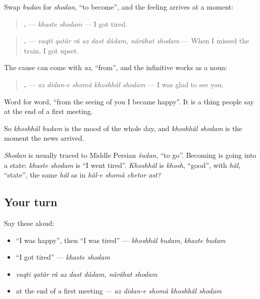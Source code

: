 \begin{grammarlens}[title={Grammar Lens: the feeling as event}]
Swap \emph{budan} for \emph{shodan}, \textquotedblleft{}to become\textquotedblright{}, and the feeling arrives at a moment:

\begin{quote}
\textbf{ .} — \emph{khaste shodam} — I got tired.
\end{quote}

\begin{quote}
\textbf{       .} — \emph{vaqti qatâr râ az dast dâdam, nârâhat shodam} — When I missed the train, I got upset.
\end{quote}

The cause can come with \emph{az}, \textquotedblleft{}from\textquotedblright{}, and the infinitive works as a noun:

\begin{quote}
\textbf{    .} — \emph{az didan-e shomâ khoshhâl shodam} — I was glad to see you.
\end{quote}

Word for word, \textquotedblleft{}from the seeing of you I became happy\textquotedblright{}. It is a thing people say at the end of a first meeting.

So \emph{khoshhâl budam} is the mood of the whole day, and \emph{khoshhâl shodam} is the moment the news arrived.
\end{grammarlens}

\begin{cousinweb}
\emph{Shodan} is usually traced to Middle Persian \emph{šudan}, \textquotedblleft{}to go\textquotedblright{}. Becoming is going into a state: \emph{khaste shodam} is \textquotedblleft{}I went tired\textquotedblright{}. \emph{Khoshhâl} is \emph{khosh}, \textquotedblleft{}good\textquotedblright{}, with \emph{hâl}, \textquotedblleft{}state\textquotedblright{}, the same \emph{hâl} as in \emph{hâl-e shomâ chetor ast?}
\end{cousinweb}

\subsection*{Your turn}
Say these aloud:

\begin{itemize}
\raggedright
  \item \textquotedblleft{}I was happy\textquotedblright{}, then \textquotedblleft{}I was tired\textquotedblright{} — \emph{khoshhâl budam}, \emph{khaste budam}
  \item \textquotedblleft{}I got tired\textquotedblright{} — \emph{khaste shodam}
  \item \emph{vaqti qatâr râ az dast dâdam, nârâhat shodam}
  \item at the end of a first meeting — \emph{az didan-e shomâ khoshhâl shodam}
\end{itemize}

